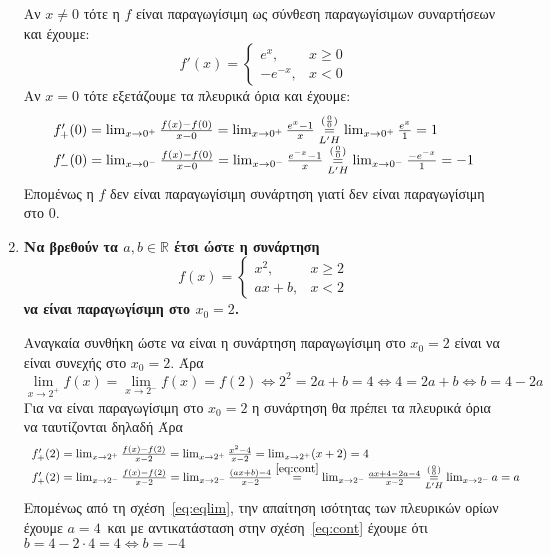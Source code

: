 \documentclass[a4paper,table]{report}
\begin{document}
\begin{enumerate}
\begin{solution}
		Αν $ x \neq 0 $ τότε η $f$ είναι παραγωγίσιμη ως σύνθεση παραγωγίσιμων
		συναρτήσεων και έχουμε:
		\[
			f'(x) = \begin{cases}
				e^{x}, & x\geq 0 \\
				-e^{-x}, & x < 0
			\end{cases}
		\]
		Αν $ x = 0 $ τότε εξετάζουμε τα πλευρικά όρια και έχουμε:
		\[
			\begin{tabular}{l}
			$f_{+}'(0) = \lim_{x\to 0^{+}} \frac{f(x) - f(0)}{x - 0} = \lim_{x \to
				0^{+}} \frac{e^{x} - 1}{x}
				\overset{(\frac{0}{0})}{\underset{L'H}{=}} \lim_{x\to 0^{+}}
			\frac{e^{x}}{1} = 1 $ \\
			$f_{-}'(0) = \lim_{x\to 0^{-}} \frac{f(x) - f(0)}{x - 0} =
			\lim_{x\to 0^{-}} \frac{e^{-x} - 1}{x} \overset{(\frac{0}{0})}{\underset{L'H}{=}}
			\lim_{x\to 0^{-}}
			\frac{-e^{-x}}{1} = -1 $
			\end{tabular}
		\]
		Επομένως η $f$ δεν είναι παραγωγίσιμη συνάρτηση γιατί δεν είναι
		παραγωγίσιμη στο 0.
    \end{solution}

	\item {\bfseries \boldmath Να βρεθούν τα $ a, b \in \mathbb{R} $ έτσι ώστε η συνάρτηση 
		\[
			f(x) = \begin{cases}
				x^{2}, & x\geq 2 \\
				ax+b , & x<2
			\end{cases}
		\]
	να είναι παραγωγίσιμη στο $ x_{0} = 2 $.}
  \begin{solution}
		Αναγκαία συνθήκη ώστε να είναι η συνάρτηση παραγωγίσιμη στο $ x_{0} = 2
		$ είναι να είναι συνεχής στο $ x_{0} = 2 $. Άρα
		\begin{equation}\label{eq:cont}
			\lim_{x\to 2^{+}} f(x) = \lim_{x\to 2^{-}} f(x) = f(2)
			\Leftrightarrow 2^{2} = 2a + b = 4 \Leftrightarrow 4 = 2a + b
			\Leftrightarrow b = 4 - 2a
		\end{equation}
		Για να είναι παραγωγίσιμη στο $ x_{0} = 2 $ η συνάρτηση θα πρέπει τα
		πλευρικά όρια να ταυτίζονται δηλαδή  Άρα
		\[
			\begin{tabular}{l}
			$f_{+}'(2) = \lim_{x\to 2^{+}} \frac{f(x) - f(2)}{x - 2} =
			\lim_{x\to 2^{+}} \frac{x^{2} - 4}{x - 2} = \lim_{x\to 2^{+}} (x+2)
			= 4$ \\
			$f_{+}'(2) = \lim_{x\to 2^{-}} \frac{f(x)- f(2)}{x-2} = \lim_{x\to
			2^{-}} \frac{(ax+b) - 4}{x - 2}\overset{\eqref{eq:cont}}{=} \lim_{x\to 2^{-}}
				\frac{ax+4 - 2a - 4}{x - 2}
				\overset{(\frac{0}{0})}{\underset{L'H}{=}} \lim_{x\to 2^{-}} a = a$
			\end{tabular}
		\]
		Επομένως από τη σχέση~\eqref{eq:eqlim}, την απαίτηση ισότητας των
		πλευρικών ορίων έχουμε $ a = 4 $ και με αντικατάσταση στην
		σχέση~\eqref{eq:cont} έχουμε ότι $ b = 4 - 2\cdot 4 = 4 \Leftrightarrow
		b = -4$ 
  \end{solution}


\end{enumerate}
\end{document}

